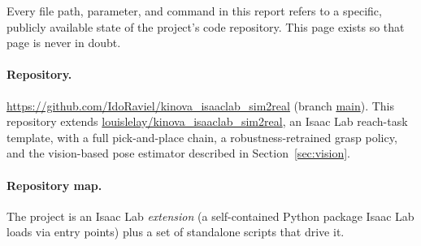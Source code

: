 \documentclass[11pt]{article}
\begin{document}
Every file path, parameter, and command in this report refers to a specific,
publicly available state of the project's code repository. This page exists so
that page is never in doubt.

\paragraph{Repository.} \url{https://github.com/IdoRaviel/kinova_isaaclab_sim2real}
(branch \url{main}). This repository extends
\href{https://github.com/louislelay/kinova_isaaclab_sim2real}{\url{louislelay/kinova_isaaclab_sim2real}},
an Isaac Lab reach-task template, with a full pick-and-place chain, a robustness-retrained
grasp policy, and the vision-based pose estimator described in
Section~\ref{sec:vision}.

\paragraph{Repository map.} The project is an Isaac Lab \emph{extension}
(a self-contained Python package Isaac Lab loads via entry points) plus a set of
standalone scripts that drive it.
\end{document}
